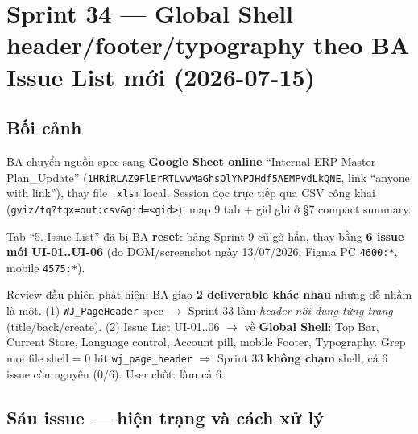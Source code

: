 \chapter{Sprint 34 --- Global Shell header/footer/typography theo BA Issue List mới (2026-07-15)}

\section{Bối cảnh}

BA chuyển nguồn spec sang \textbf{Google Sheet online} ``Internal ERP Master Plan\_Update''
(\texttt{1HRiRLAZ9FlErRTLvwMaGhsOlYNPJHdf5AEMPvdLkQNE}, link ``anyone with link''), thay file
\texttt{.xlsm} local. Session đọc trực tiếp qua CSV công khai
(\texttt{gviz/tq?tqx=out:csv\&gid=<gid>}); map 9 tab + gid ghi ở \S7 compact summary.

Tab ``5. Issue List'' đã bị BA \textbf{reset}: bảng Sprint-9 cũ gỡ hẳn, thay bằng \textbf{6 issue mới
UI-01..UI-06} (đo DOM/screenshot ngày 13/07/2026; Figma PC \texttt{4600:*}, mobile \texttt{4575:*}).

Review đầu phiên phát hiện: BA giao \textbf{2 deliverable khác nhau} nhưng dễ nhầm là một.
(1) \texttt{WJ\_PageHeader} spec $\to$ Sprint 33 làm \emph{header nội dung từng trang} (title/back/create).
(2) Issue List UI-01..06 $\to$ về \textbf{Global Shell}: Top Bar, Current Store, Language control,
Account pill, mobile Footer, Typography. Grep mọi file shell = 0 hit \texttt{wj\_page\_header}
$\Rightarrow$ Sprint 33 \textbf{không chạm} shell, cả 6 issue còn nguyên (0/6). User chốt: làm cả 6.

\section{Sáu issue --- hiện trạng và cách xử lý}

